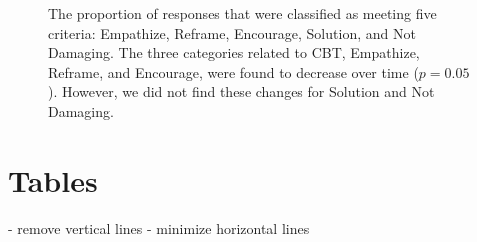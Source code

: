 \begin{figure}

\caption{The proportion of responses that were classified as meeting five criteria: Empathize, Reframe, Encourage, Solution, and Not Damaging. The three categories related to CBT, Empathize, Reframe, and Encourage, were found to decrease over time ($p=0.05$). However, we did not find these changes for Solution and Not Damaging. 
} 

\label{fig:SolutionsOverQueryNumber}
\end{figure}




\section{Tables}

- remove vertical lines
- minimize horizontal lines

